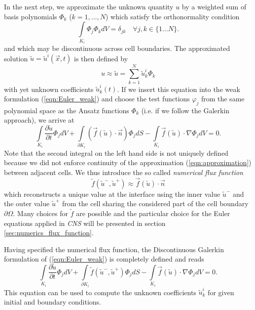 In the next step, we approximate the unknown quantity $u$ by a weighted sum of
basis polynomials $\Phi_k$ ($k = 1, \ldots, N$) which satisfy the orthonormality
condition
\begin{equation}
    \label{eqn:orthonormality}
    \int\limits_{K_i} \Phi_j \Phi_k dV = \delta_{jk} \quad \forall j,k \in \{1 \ldots N\}.
\end{equation}
and which may be discontinuous across cell boundaries.
The approximated solution $\tilde{u} = \tilde{u}^i(\vec{x}, t)$ is then defined by
\begin{equation}
	\label{eqn:approximation}
	u \approx \tilde{u}
	= \sum \limits_{k=1}^N \tilde{u}_k^i \Phi_k
\end{equation}
with yet unknown coefficients $\tilde{u}_k^i(t)$. If we insert this equation
into the weak formulation (\ref{eqn:Euler_weak}) and choose the test functions
$\varphi_j$ from the same polynomial space as the Ansatz functions $\Phi_k$
(i.e. if we follow the Galerkin approach), we arrive at
\begin{equation}
	\int \limits_{K_i} \frac{\partial \tilde{u}}{\partial t} \Phi_j dV
	+ \int \limits_{\partial K_i}
		\left(\vec{f}(\tilde{u}) \cdot \vec{n} \right) \Phi_j dS
	- \int \limits_{K_i} \vec{f}(\tilde{u}) \cdot \nabla \Phi_j dV
	= 0.
\end{equation}
Note that the second integral on the left hand side is not uniquely defined
because we did not enforce continuity of the approximation
(\ref{eqn:approximation}) between adjacent cells. We thus introduce the
so called \emph{numerical flux function}
\begin{equation}
	\tilde{f}(\tilde{u}^-, \tilde{u}^+) \approx \vec{f}(\tilde{u}) \cdot \vec{n}
\end{equation}
which reconstructs a unique value at the interface using the inner value
$\tilde{u}^-$ and the outer value $\tilde{u}^+$ from the cell sharing the
considered part of the cell boundary $\partial \Omega$. Many choices for
$\tilde{f}$ are possible and the particular choice for the Euler equations
applied in \emph{CNS} will be presented in section
\ref{sec:numerics_flux_function}.

Having specified the numerical flux
function, the Discontinuous Galerkin formulation of (\ref{eqn:Euler_weak}) is
completely defined and reads
\begin{equation}
	\label{eqn:Euler_DG}
	\int \limits_{K_i} \frac{\partial \tilde{u}}{\partial t} \Phi_j dV
	+ \int \limits_{\partial K_i} \tilde{f}(\tilde{u}^-, \tilde{u}^+) \Phi_j dS
	- \int \limits_{K_i} \vec{f}(\tilde{u}) \cdot \nabla \Phi_j dV
	= 0.
\end{equation}
This equation can be used to compute the unknown coefficients $\tilde{u}_k^i$
for given initial and boundary conditions.
